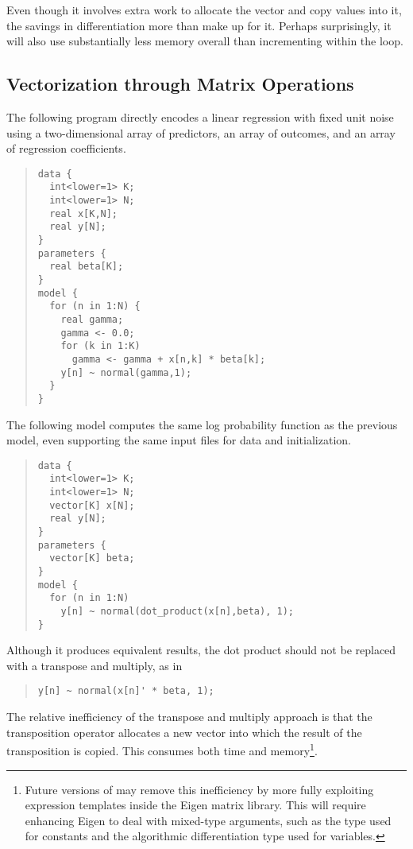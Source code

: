 Even though it involves extra work to allocate the 
vector and copy  values into it, the savings in
differentiation more than make up for it.  Perhaps surprisingly,
it will also use substantially less memory overall than incrementing
 within the loop.


\subsection{Vectorization through Matrix Operations}

The following program directly encodes a linear regression with fixed
unit noise using a two-dimensional array  of predictors, an
array  of outcomes, and an array  of regression
coefficients.
%
\begin{quote}
\begin{Verbatim}[fontsize=\small]
data {
  int<lower=1> K;
  int<lower=1> N;
  real x[K,N];
  real y[N];
}
parameters {
  real beta[K];
}
model {
  for (n in 1:N) {
    real gamma;  
    gamma <- 0.0;
    for (k in 1:K)
      gamma <- gamma + x[n,k] * beta[k];
    y[n] ~ normal(gamma,1);
  }
}
\end{Verbatim}
\end{quote}
%
The following model computes the same log probability function as the
previous model, even supporting the same input files for data and
initialization.
%
\begin{quote}
\begin{Verbatim}[fontsize=\small]
data {
  int<lower=1> K;
  int<lower=1> N;
  vector[K] x[N];
  real y[N];
}
parameters {
  vector[K] beta;
}
model {
  for (n in 1:N)
    y[n] ~ normal(dot_product(x[n],beta), 1);
}
\end{Verbatim}
\end{quote}
%
Although it produces equivalent results, the dot product should not be
replaced with a transpose and multiply, as in
%
\begin{quote}
\begin{Verbatim}[fontsize=\small]
        y[n] ~ normal(x[n]' * beta, 1);
\end{Verbatim}
\end{quote}
%
The relative inefficiency of the transpose and multiply approach is
that the transposition operator allocates a new vector into which the
result of the transposition is copied.  This consumes both time
and memory\footnote{Future versions of \Stan may remove this inefficiency
by more fully exploiting expression templates inside the Eigen
\Cpp matrix library.  This will require enhancing Eigen to deal
with mixed-type arguments, such as the type  used
for constants and the algorithmic differentiation type
used for variables.}.

